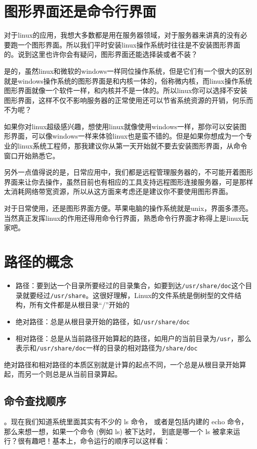 \section{图形界面还是命令行界面}
{{\kai 对于linux的应用，我想大多数都是用在服务器领域，对于服务器来讲真的没有必要跑一个图形界面。所以我们平时安装linux操作系统时往往是不安装图形界面的。说到这里也许你会有疑问，图形界面还能选择装或者不装？

是的，虽然linux和微软的windows一样同位操作系统，但是它们有一个很大的区别就是windows操作系统的图形界面是和内核一体的，俗称微内核，而linux操作系统图形界面就像一个软件一样，和内核并不是一体的。所以linux你可以选择不安装图形界面，这样不仅不影响服务器的正常使用还可以节省系统资源的开销，何乐而不为呢？

如果你对linux超级感兴趣，想使用linux就像使用windows一样，那你可以安装图形界面，可以像windows一样来体验linux也是蛮不错的。但是如果你想成为一个专业的linux系统工程师，那我建议你从第一天开始就不要去安装图形界面，从命令窗口开始熟悉它。

另外一点值得说的是，日常应用中，我们都是远程管理服务器的，不可能开着图形界面来让你去操作，虽然目前也有相应的工具支持远程图形连接服务器，可是那样太消耗网络带宽资源，所以从这方面来考虑还是建议你不要使用图形界面。}

对于日常使用，还是图形界面方便。苹果电脑的操作系统就是unix，界面多漂亮。当然真正发挥linux的作用还得用命令行界面，熟悉命令行界面才称得上是linux玩家吧。


\section{路径的概念}
\begin{itemize}
\item 路径：要到达一个目录所要经过的目录集合，如要到达\verb|/usr/share/doc|这个目录就要经过\verb|/usr/share|。这很好理解，Linux的文件系统是倒树型的文件结构，所有文件都是从根目录“/”开始的

\item 绝对路径：总是从根目录开始的路径，如\verb|/usr/share/doc|

\item 相对路径：总是从当前路径开始算起的路径，如用户的当前目录为\verb|/usr|，那么表示和\verb|/usr/share/doc|一样的目录的相对路径为\verb|/share/doc|
\end{itemize}

绝对路径和相对路径的本质区别就是计算的起点不同，一个总是从根目录开始算起，而另一个则总是从当前目录算起。


\subsection{命令查找顺序}
。现在我们知道系统里面其实有不少的 ls 命令， 或者是包括内建的 echo 命令，那么来想一想，如果一个命令 (例如 ls) 被下达时， 到底是哪一个 ls 被拿来运行？很有趣吧！基本上，命令运行的顺序可以这样看：

}
